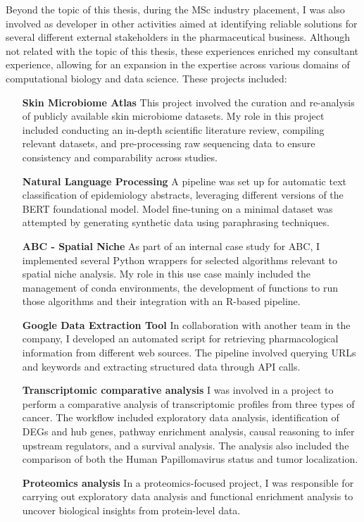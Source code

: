 Beyond the topic of this thesis, during the MSc industry placement, I was also involved as developer in other activities aimed at identifying reliable solutions for several different external stakeholders in the pharmaceutical business. Although not related with the topic of this thesis, these experiences enriched my consultant experience, allowing for an expansion in the expertise across various domains of computational biology and data science. 
These projects included:

\begin{enumerate}
\item[\textbf{Skin Microbiome Atlas}] This project involved the curation and re-analysis of publicly available skin microbiome datasets. My role in this project included conducting an in-depth scientific literature review, compiling relevant datasets, and pre-processing raw sequencing data to ensure consistency and comparability across studies. 
\item[\textbf{Natural Language Processing}] A pipeline was set up for automatic text classification of epidemiology abstracts, leveraging different versions of the BERT foundational model. Model fine-tuning on a minimal dataset was attempted by generating synthetic data using paraphrasing techniques. 
\item[\textbf{\gls{ABC} - Spatial Niche}] As part of an internal case study for \gls{ABC}, I implemented several Python wrappers for selected algorithms relevant to spatial niche analysis. My role in this use case mainly included the management of conda environments, the development of functions to run those algorithms and their integration with an \gls{R}-based pipeline.
\item[\textbf{Google Data Extraction Tool}] In collaboration with another team in the company, I developed an automated script for retrieving pharmacological information from different web sources. The pipeline involved querying URLs and keywords and extracting structured data through API calls.
\item[\textbf{Transcriptomic comparative analysis}] I was involved in a project to perform a comparative analysis of transcriptomic profiles from three types of cancer. The workflow included exploratory data analysis, identification of \gls{DEGs} and hub genes, pathway enrichment analysis, causal reasoning to infer upstream regulators, and a survival analysis. The analysis also included the comparison of both the Human Papillomavirus status and tumor localization.
\item[\textbf{Proteomics analysis}] In a proteomics-focused project, I was responsible for carrying out exploratory data analysis and functional enrichment analysis to uncover biological insights from protein-level data.
\end{enumerate}


